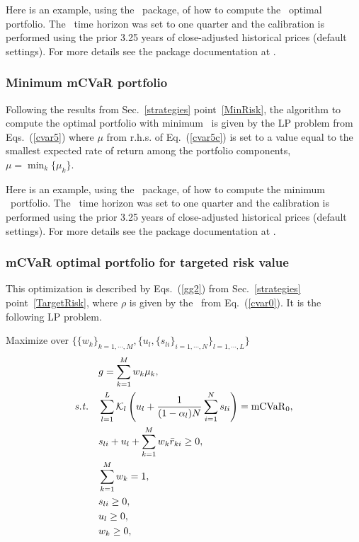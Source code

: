 \bigskip
\noindent Here is an example, using the \azapy\ package, of how to compute the \mCVaR\ optimal portfolio.
The \mCVaR\ time horizon was set to one quarter and the calibration is performed using the prior 3.25 years of
close-adjusted historical prices (default settings).
For more details see the package documentation at \azapydoc.



\BackToContents

\subsubsection{Minimum mCVaR portfolio}

Following the results from Sec.~\ref{strategies} point~\ref{MinRisk},
the algorithm to compute the optimal portfolio with minimum \mCVaR\ is given by the LP problem from Eqs.~(\ref{cvar5}) where
$\mu$ from r.h.s. of Eq.~(\ref{cvar5c}) is set to a value equal to the smallest expected rate of
return among the portfolio components, \ie\ $\mu = \min_k\{\mu_k\}$.

\bigskip
\noindent Here is an example, using the \azapy\ package, of how to compute the minimum \mCVaR\ portfolio.
The \mCVaR\ time horizon was set to one quarter and the calibration is performed using the prior 3.25 years of
close-adjusted historical prices (default settings).
For more details see the package documentation at \azapydoc.



\BackToContents

\subsubsection{mCVaR optimal portfolio for targeted risk value}

This optimization is described by Eqs.~(\ref{gg2}) from Sec.~\ref{strategies} point~\ref{TargetRisk},
where $\rho$ is given by the \mCVaR\ from Eq.~(\ref{cvar0}).
It is the following LP problem.

\bigskip
\noindent Maximize over $\{ \{w_k\}_{k=1,\cdots,M}, \{ u_l, \{ s_{li}\}_{i=1,\cdots,N} \}_{l=1,\cdots, L}\}$
\begin{subequations}\label{cvar7}
\begin{align}
    &g = \sum_{k=1}^M w_k \mu_k, \label{cvar7a} \\
    \st & \sum_{l=1}^L \cK_l \left( u_l + \frac{1}{(1-\alpha_l) N} \sum_{i=1}^N s_{li} \right) = \mCVaR_0, \label{cvar7c} \\
        &s_{li} + u_l + \sum_{k=1}^M w_k \br_{ki} \geq 0, \label{cvar7b} \\
        & \sum_{k=1}^M w_k = 1, \label{cvar7d} \\
        & s_{li} \geq 0, \label{cvar7e} \\
        & u_l \geq 0, \label{cvar7f} \\
        & w_k \geq 0, \label{cvar7g}
\end{align}
\end{subequations}

